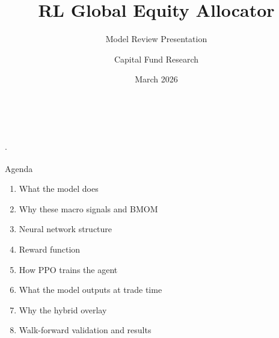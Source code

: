 \documentclass[aspectratio=169,11pt]{beamer}
\title{RL Global Equity Allocator}
\subtitle{Model Review Presentation}
\author{Capital Fund Research}
\date{March 2026}
\begin{document}
\begin{frame}[plain]
  \vfill
  \begin{center}
    {\color{white}\inserttitle}\\[0.5em]
    {\color{capgold}\large\insertsubtitle}\\[1.5em]
    {\color{white}\normalsize\insertauthor\quad$\cdot$\quad\insertdate}
  \end{center}
  \vfill
\end{frame}

\begin{frame}{Agenda}
  \begin{enumerate}\large
    \setlength\itemsep{0.6em}
    \item What the model does
    \item Why these macro signals and BMOM
    \item Neural network structure
    \item Reward function
    \item How PPO trains the agent
    \item What the model outputs at trade time
    \item Why the hybrid overlay
    \item Walk-forward validation and results
  \end{enumerate}
\end{frame}

\end{document}
